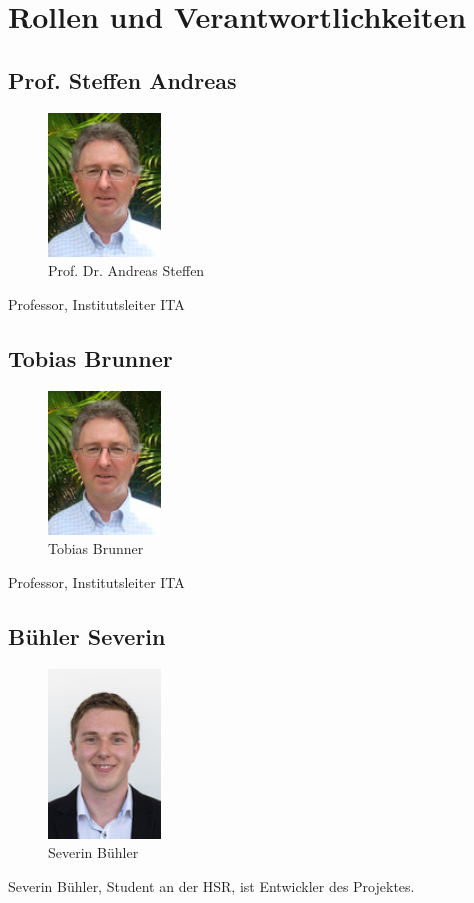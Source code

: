 \section{Rollen und Verantwortlichkeiten}
\subsection{Prof. Steffen Andreas}
\begin{figure}[H]
	\centering
	\includegraphics[width=30mm]{images/asteffen.jpg}
	\caption{Prof. Dr. Andreas Steffen}
\end{figure}
Professor, Institutsleiter ITA

\subsection{Tobias Brunner}
\begin{figure}[H]
	\centering
	\includegraphics[width=30mm]{images/asteffen.jpg}
	\caption{Tobias Brunner}
\end{figure}
Professor, Institutsleiter ITA

\subsection{Bühler Severin}
\begin{figure}[H]
	\centering
	\includegraphics[width=30mm]{images/sbuehler.jpg}
	\caption{Severin Bühler}
\end{figure}
Severin Bühler, Student an der HSR, ist Entwickler des Projektes.
